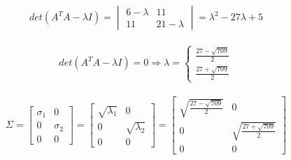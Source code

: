 \documentclass[a4paper, spanish]{article}
\begin{document}
  \begin{align}
    det(A^T A - \lambda I)
    = \begin{vmatrix}
      6 - \lambda & 11 \\
      11 & 21 - \lambda
    \end{vmatrix}
    = \lambda ^ 2 - 27 \lambda + 5
  \end{align}


  \begin{align}
    det(A^T A - \lambda I) = 0
    \Rightarrow
    \lambda =
    \begin{cases}
    \frac{27 - \sqrt{709}}{2} \\
    \frac{27 + \sqrt{709}}{2}
    \end{cases}
  \end{align}



  \begin{align}
    \Sigma =
    \begin{bmatrix}
      \sigma_1 & 0 \\
      0 & \sigma_2 \\
      0 & 0
    \end{bmatrix}
    =
    \begin{bmatrix}
      \sqrt{\lambda_1} & 0 \\
      0 & \sqrt{\lambda_2} \\
      0 & 0
    \end{bmatrix} =
    \begin{bmatrix}
      \sqrt{\frac{27 - \sqrt{709}}{2}} & 0 \\
      0 & \sqrt{\frac{27 + \sqrt{709}}{2}} \\
      0 & 0
    \end{bmatrix}
  \end{align}
\end{document}
